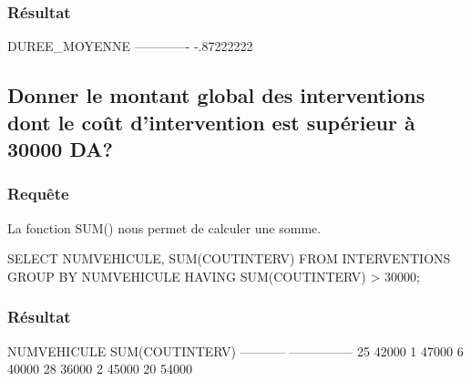 \documentclass[•]{article}
\begin{document}
\subsubsection{Résultat}
\begin{sql}
    DUREE_MOYENNE                                                                   
    -------------                                                                   
       -.87222222                                                                       
\end{sql}
\subsection{Donner le montant global des interventions dont le coût d’intervention est supérieur à 30000 DA?}
\subsubsection{Requête}
\textrm{La fonction SUM() nous permet de calculer une somme. }
\begin{sql}
SELECT NUMVEHICULE, SUM(COUTINTERV) FROM INTERVENTIONS GROUP BY NUMVEHICULE HAVING SUM(COUTINTERV) > 30000;
\end{sql}
\subsubsection{Résultat}
\begin{sql}
    NUMVEHICULE SUM(COUTINTERV)                                                     
    ----------- ---------------                                                     
             25           42000                                                     
              1           47000                                                     
              6           40000                                                     
             28           36000                                                     
              2           45000                                                     
             20           54000 
\end{sql}
\end{document}
